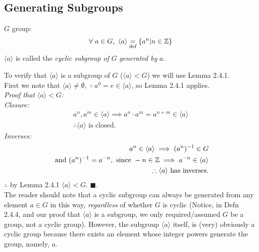 \subsection{Generating Subgroups}
\begin{definition}
$G$ group:
\begin{align}
    \forall \ a\in G, \ \langle a \rangle \underset{\text{def}}{=} \{a^n |n\in {\mathbb{ Z}}\}\nonumber
\end{align}
$\langle a \rangle$ is called the \textit{cyclic subgroup of }$G$ \textit{generated by} $a$.\steezybreak\\
\end{definition}
To verify that $\langle a \rangle$ is a subgroup of $G$ ($\langle a \rangle<G$) we will use Lemma 2.4.1. \\ 
First we note that $\langle a \rangle\neq \emptyset, \ \because \ a^0=e\in \langle a \rangle$, so Lemma 2.4.1 applies.\\
\textit{Proof that $\langle a \rangle < G$:}\\
\textit{Closure:} 
\begin{align}
    a^n,a^m\in \langle a \rangle \implies a^n\cdot a^m=a^{n+m}\in \langle a \rangle \nonumber\\
    \therefore \langle a \rangle \text{ is closed.}\nonumber
\end{align}
\textit{Inverses:} 
\begin{align}
    a^n\in \langle a \rangle \implies (a^n)^{-1}\in G \nonumber\\
    \text{ and }(a^n)^{-1}=a^{-n}, \text{ since } -n\in {\mathbb{ Z}} \implies a^{-n}\in \langle a \rangle \nonumber\\
    \therefore \langle a \rangle \text{ has inverses.} \nonumber
\end{align}
$\therefore$ by Lemma 2.4.1 $\langle a \rangle < G$. $\blacksquare$. \steezybreak \\ 
The reader should note that a cyclic subgroup can always be generated from any element $a\in G$ in this way, \textit{regardless} of whether $G$ is cyclic (Notice, in Defn 2.4.4, and our proof that $\langle a \rangle$ is a subgroup, we only required/assumed $G$ be a group, not a cyclic group). However, the subgroup $\langle a \rangle$ itself, is (very) obviously a cyclic group because there exists an element whose integer powers generate the group, namely, $a$.
